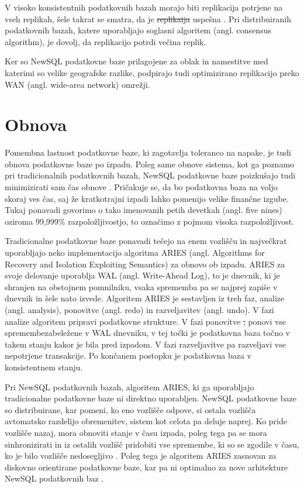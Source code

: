 \documentclass[a4paper, 12pt]{book}
\providecommand{\DIFaddtex}[1]{{\protect\color{blue}\uwave{#1}}} %
\providecommand{\DIFdeltex}[1]{{\protect\color{red}\sout{#1}}}                      %
\providecommand{\DIFaddbegin}{} %
\providecommand{\DIFaddend}{} %
\providecommand{\DIFdelbegin}{} %
\providecommand{\DIFdelend}{} %
\providecommand{\DIFadd}[1]{\texorpdfstring{\DIFaddtex{#1}}{#1}} %
\providecommand{\DIFdel}[1]{\texorpdfstring{\DIFdeltex{#1}}{}} %
\newcommand{\DIFscaledelfig}{0.5}
\newlength{\DIFdelgraphicswidth} %
\newlength{\DIFdelgraphicsheight} %
\newcommand{\DIFaddincludegraphics}[2][]{{\color{blue}\fbox{\DIFOincludegraphics[#1]{#2}}}} %
\newcommand{\DIFdelincludegraphics}[2][]{%
\sbox{\DIFdelgraphicsbox}{\DIFOincludegraphics[#1]{#2}}%
\settoboxwidth{\DIFdelgraphicswidth}{\DIFdelgraphicsbox} %
\settoboxtotalheight{\DIFdelgraphicsheight}{\DIFdelgraphicsbox} %
\scalebox{\DIFscaledelfig}{%
\parbox[b]{\DIFdelgraphicswidth}{\usebox{\DIFdelgraphicsbox}\\[-\baselineskip] \rule{\DIFdelgraphicswidth}{0em}}\llap{\resizebox{\DIFdelgraphicswidth}{\DIFdelgraphicsheight}{%
\setlength{\unitlength}{\DIFdelgraphicswidth}%
\begin{picture}(1,1)%
\thicklines\linethickness{2pt} %
{\color[rgb]{1,0,0}\put(0,0){\framebox(1,1){}}}%
{\color[rgb]{1,0,0}\put(0,0){\line( 1,1){1}}}%
{\color[rgb]{1,0,0}\put(0,1){\line(1,-1){1}}}%
\end{picture}%
}\hspace*{3pt}}} %
} %
\DeclareRobustCommand{\DIFaddbegin}{\DIFOaddbegin \let\includegraphics\DIFaddincludegraphics} %
\DeclareRobustCommand{\DIFaddend}{\DIFOaddend \let\includegraphics\DIFOincludegraphics} %
\DeclareRobustCommand{\DIFdelbegin}{\DIFOdelbegin \let\includegraphics\DIFdelincludegraphics} %
\DeclareRobustCommand{\DIFdelend}{\DIFOaddend \let\includegraphics\DIFOincludegraphics} %
\begin{document}
V visoko konsistentnih podatkovnih bazah morajo biti replikacija potrjene na vseh replikah, šele takrat se smatra, da je \DIFdelbegin \DIFdel{replikaija }\DIFdelend \DIFaddbegin \DIFadd{replikacija }\DIFaddend uspešna \cite{NewSqlInMemoryAnalytics}. Pri distribuiranih podatkovnih bazah, katere uporabljajo soglasni algoritem (angl. consensus algorithm), je dovolj, da replikacijo potrdi večina replik.

Ker so NewSQL podatkovne baze prilagojene za oblak in namestitve med katerimi so velike geografske razlike, podpirajo tudi optimizirano replikacijo preko WAN (angl. wide-area network) omrežji.

\section{Obnova}
Pomembna lastnost podatkovne baze, ki zagotavlja toleranco na napake, je tudi obnova podatkovne baze po izpadu. Poleg same obnove sistema, kot ga poznamo pri tradicionalnih podatkovnih bazah, NewSQL podatkovne baze  poizkušajo tudi minimizirati sam čas obnove \cite{Pavlo2016Sep}. Pričakuje se, da bo podatkovna baza na voljo skoraj ves čas, saj že kratkotrajni izpadi lahko pomenijo velike finančne izgube. Tukaj ponavadi govorimo o tako imenovanih petih devetkah (angl. five nines) oziroma 99,999\% razpoložljivostjo, to označimo z pojmom visoka razpoložljivost.

Tradicionalne podatkovne baze ponavadi tečejo na enem vozlišču in naj\-več\-krat uporabljajo neko implementacijo algoritma ARIES (angl. Algorithms for Recovery and Isolation Exploiting Semantics) za obnovo ob izpadu. ARIES za svoje delovanje uporablja WAL (angl. Write-Ahead Log), to je dnevnik, ki je shranjen na obstojnem pomnilniku, vsaka sprememba pa se najprej zapiše v dnevnik in šele nato izvede. Algoritem ARIES je sestavljen iz treh faz, analize (angl. analysis), ponovitve (angl. redo) in razveljavitev (angl. undo). V fazi analize algoritem pripravi podatkovne strukture. V fazi ponovitve \DIFdelbegin \DIFdel{, }\DIFdelend ponovi vse spremembe\DIFaddbegin \DIFadd{, }\DIFaddend zabeležene v WAL dnevniku, v tej točki je podatkovna baza točno v takem stanju kakor je bila pred izpadom. V fazi razveljavitve pa razveljavi vse nepotrjene transakcije. Po končanem postopku je podatkovna baza v konsistentnem stanju. \cite{Pavlo2016Sep}

Pri NewSQL podatkovnih bazah, algoritem ARIES, ki ga uporabljajo tradicionalne podatkovne baze ni direktno uporabljen. NewSQL podatkovne baze so distribuirane, kar pomeni, ko eno vozlišče odpove, si ostala vozlišča avtomatsko razdelijo obremenitev, sistem kot celota pa deluje naprej. Ko pride vozlišče nazaj, mora obnoviti stanje v času izpada, poleg tega pa se mora sinhronizirati in iz ostalih vozlišč pridobiti vse spremembe, ki so se zgodile v času, ko je bilo vozlišče nedosegljivo \cite{Pavlo2016Sep}. Poleg tega je algoritem ARIES zasnovan za diskovno orientirane podatkovne baze, kar pa ni optimalno za nove \DIFaddbegin \DIFadd{pomnilniško usmerjene }\DIFaddend arhitekture NewSQL podatkovnih baz \cite{zheng2014fast}.
\end{document}
